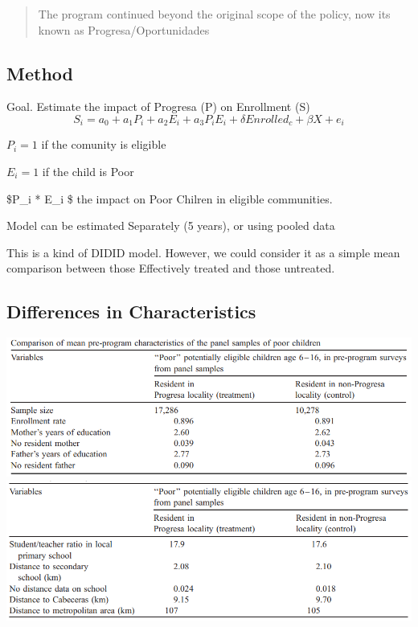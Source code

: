 \documentclass[
  letterpaper,
  DIV=11,
  numbers=noendperiod]{scrartcl}
\begin{document}
\begin{quote}
The program continued beyond the original scope of the policy, now its
known as Progresa/Oportunidades
\end{quote}

\hypertarget{method}{%
\subsection{Method}\label{method}}

Goal. Estimate the impact of Progresa (P) on Enrollment (S) \[
S_i = a_0 +a_1 P_i + a_2 E_i + a_3 P_iE_i + \delta Enrolled_c + \beta X + e_i
\]

\(P_i=1\) if the comunity is eligible

\(E_i=1\) if the child is Poor

\$P\_i * E\_i \$ the impact on Poor Chilren in eligible communities.

Model can be estimated Separately (5 years), or using pooled data

This is a kind of DIDID model. However, we could consider it as a simple
mean comparison between those Effectively treated and those untreated.

\hypertarget{differences-in-characteristics}{%
\subsection{Differences in
Characteristics}\label{differences-in-characteristics}}

\includegraphics{./po_ci_files/fig3.png}
\includegraphics{./po_ci_files/fig4.png}
\end{document}
